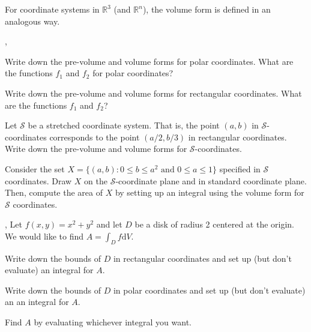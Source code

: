 \documentclass[letter]{article}
\newcommand{\R}{\mathbb{R}}
\renewcommand{\d}{\mathrm{d}}
\newcommand{\sepl}{\sep \vspace{-.35in}}
\renewcommand{\emph}[1]{{\color{defcolor} \textbf{\textit{##1}}}}
\begin{document}
	For coordinate systems in $\R^3$ (and $\R^n$), the volume form is defined in an analogous way.


	\sepl
	\begin{Enum}
		\item Write down the pre-volume and volume forms for polar coordinates.  What are the functions
			$f_1$ and $f_2$ for polar coordinates?
		\item Write down the pre-volume and volume forms for rectangular coordinates.  What
			are the functions $f_1$ and $f_2$?
		\item Let $\mathcal S$ be a stretched coordinate system.  That is, the point $(a,b)$ in
			$\mathcal S$-coordinates corresponds to the point $(a/2, b/3)$ in rectangular 
			coordinates.  Write down the pre-volume and volume forms for $\mathcal S$-coordinates.
		\item Consider the set $X=\{(a,b): 0\leq b\leq a^2\text{ and }0\leq a\leq 1\}$ specified in $\mathcal S$ coordinates.
			Draw $X$ on the $\mathcal S$-coordinate plane and in standard coordinate plane.  Then, compute
			the area of $X$ by setting up an integral using the volume form for $\mathcal S$ coordinates.
	\end{Enum}

	\sep
	Let $f(x,y)=x^2+y^2$ and let $D$ be a disk of radius 2 centered at the origin.  We would like to
	find $A=\displaystyle \int_D f\d V$.
	\begin{Enum}
		\item Write down the bounds of $D$ in rectangular coordinates and set up (but don't evaluate)
			an integral for $A$.
		\item Write down the bounds of $D$ in polar coordinates and set up (but don't evaluate) an 
			an integral for $A$.
		\item Find $A$ by evaluating whichever integral you want.
	\end{Enum}
\end{document}
